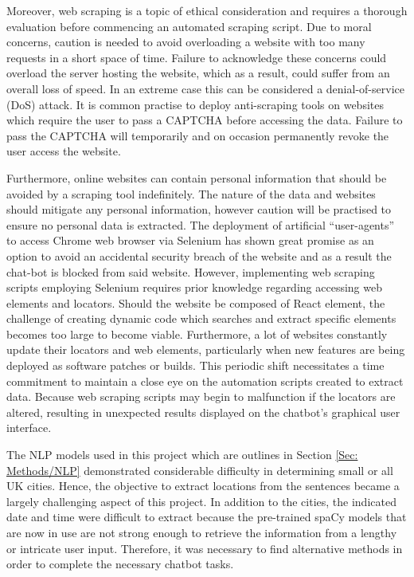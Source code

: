 \noindent
Moreover, web scraping is a topic of ethical consideration and requires a thorough evaluation before commencing an automated scraping script. Due to moral concerns, caution is needed to avoid overloading a website with too many requests in a short space of time. Failure to acknowledge these concerns could overload the server hosting the website, which as a result, could suffer from an overall loss of speed. In an extreme case this can be considered a denial-of-service (DoS) attack. It is common practise to deploy anti-scraping tools on websites which require the user to pass a CAPTCHA before accessing the data. Failure to pass the CAPTCHA will temporarily and on occasion permanently revoke the user access the website.\vspace{0.5cm}

\noindent
Furthermore, online websites can contain personal information that should be avoided by a scraping tool indefinitely. The nature of the data and websites should mitigate any personal information, however caution will be practised to ensure no personal data is extracted. The deployment of artificial ``user-agents'' to access Chrome web browser via Selenium has shown great promise as an option to avoid an accidental security breach of the website and as a result the chat-bot is blocked from said website. However, implementing web scraping scripts employing Selenium requires prior knowledge regarding accessing web elements and locators. Should the website be composed of React element, the challenge of creating dynamic code which searches and extract specific elements becomes too large to become viable. Furthermore, a lot of websites constantly update their locators and web elements, particularly when new features are being deployed as software patches or builds. This periodic shift necessitates a time commitment to maintain a close eye on the automation scripts created to extract data. Because web scraping scripts may begin to malfunction if the locators are altered, resulting in unexpected results displayed on the chatbot's graphical user interface.
 \vspace{0.5cm}

\noindent
The NLP models used in this project which are outlines in Section \ref{Sec: Methods/NLP} demonstrated considerable difficulty in determining small or all UK cities. Hence, the objective to extract locations from the sentences became a largely challenging aspect of this project. In addition to the cities, the indicated date and time were difficult to extract because the pre-trained spaCy models that are now in use are not strong enough to retrieve the information from a lengthy or intricate user input. Therefore, it was necessary to find alternative methods in order to complete the necessary chatbot tasks. \vspace{0.5cm}

